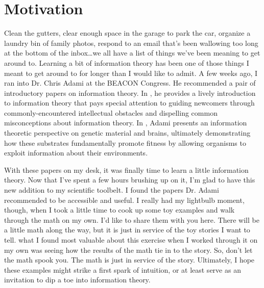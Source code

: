 \section{Motivation}
Clean the gutters, clear enough space in the garage to park the car, organize a laundry bin of family photos, respond to an email that's been wallowing too long at the bottom of the inbox\ldots we all have a list of things we've been meaning to get around to.
Learning a bit of information theory has been one of those things I meant to get around to for longer than I would like to admit.
A few weeks ago, I ran into Dr. Chris Adami at the BEACON Congress.
He recommended a pair of introductory papers on information theory.
In \cite{Adami2016}, he provides a lively introduction to information theory that pays special attention to guiding newcomers through commonly-encountered intellectual obstacles and dispelling common misconceptions about information theory.
In \cite{Adami2012}, Adami presents an information theoretic perspective on genetic material and brains, ultimately demonstrating how these substrates fundamentally promote fitness by allowing organisms to exploit information about their environments.

With these papers on my desk, it was finally time to learn a little information theory.
Now that I've spent a few hours brushing up on it, I'm glad to have this new addition to my scientific toolbelt.
I found the papers Dr. Adami recommended to be accessible and useful.
I really had my lightbulb moment, though, when I took a little time to cook up some toy examples and walk through the math on my own.
I'd like to share them with you here.
There will be a little math along the way, but it is just in service of the toy stories I want to tell.
what I found most valuable about this exercise when I worked through it on my own was seeing how the results of the math tie in to the story.
So, don't let the math spook you.
The math is just in service of the story.
Ultimately, I hope these examples might strike a first spark of intuition, or at least serve as an invitation to dip a toe into information theory.
